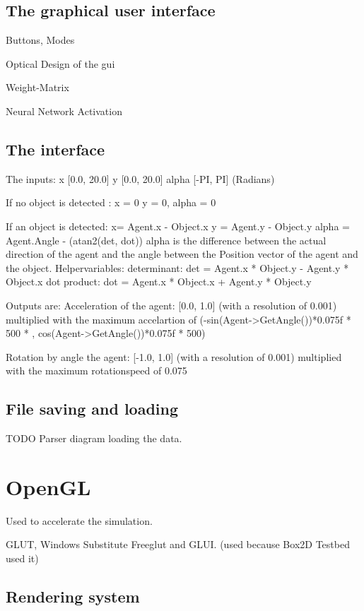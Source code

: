 \documentclass[10pt,a4paper,DIV=11]{scrreprt}
\begin{document}
\subsection{The graphical user interface}

Buttons, Modes

Optical Design of the gui

Weight-Matrix

Neural Network Activation

\subsection{The interface}


The inputs: 
x  [0.0, 20.0]
y   [0.0, 20.0]
alpha  [-PI, PI] (Radians)

If no object is detected :
x = 0
y = 0,
alpha = 0 

If an object is detected:
x= Agent.x - Object.x  
y = Agent.y - Object.y
alpha = Agent.Angle - (atan2(det, dot)) 
alpha is the difference between the actual direction of the agent and
the angle between the Position vector of the agent and the object. 
Helpervariables:
determinant: det =  Agent.x * Object.y - Agent.y * Object.x 
dot product:  dot =  Agent.x * Object.x + Agent.y * Object.y 


Outputs are:
Acceleration of the agent: [0.0, 1.0] (with a resolution of 0.001)
multiplied with the maximum accelartion of 
(-sin(Agent->GetAngle())*0.075f * 500 * ,  cos(Agent->GetAngle())*0.075f * 500)

Rotation by angle the agent: [-1.0, 1.0] (with a resolution of 0.001)
multiplied with the maximum rotationspeed of 0.075


\subsection{File saving and loading}

TODO Parser diagram loading the data.


\section{OpenGL}
Used to accelerate the simulation.


GLUT, Windows Substitute Freeglut and GLUI. (used because Box2D Testbed used it)

\subsection{Rendering system}
\end{document}
